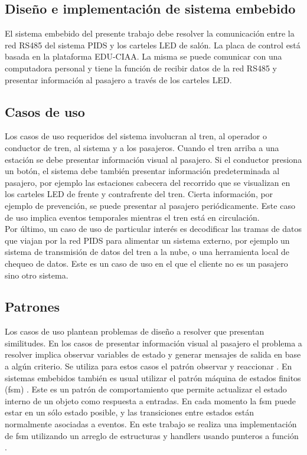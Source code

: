 \documentclass[conference]{IEEEtran}
\begin{document}
\subsection{Diseño e implementación de sistema embebido}

El sistema embebido del presente trabajo debe resolver la comunicación entre la red RS485 del sistema PIDS y los carteles LED de salón. La placa de control está basada en la plataforma EDU-CIAA. La misma se puede comunicar con una computadora personal y tiene la función de recibir datos de la red RS485 y presentar  información al pasajero a través de los carteles LED.\\

\subsection{Casos de uso}
Los casos de uso requeridos del sistema involucran al tren, al operador o conductor de tren, al sistema y a los pasajeros. Cuando el tren arriba a una estación se debe presentar información visual al pasajero. Si el conductor presiona un botón, el sistema debe también presentar información predeterminada al pasajero, por ejemplo las estaciones cabecera del recorrido que se visualizan en los carteles LED de frente y contrafrente del tren. Cierta información, por ejemplo de prevención, se puede presentar al pasajero periódicamente. Este caso de uso implica eventos temporales mientras el tren está en circulación.\\

 Por último, un caso de uso de particular interés es decodificar las tramas de datos que viajan por la red PIDS para alimentar un sistema externo, por ejemplo un sistema de transmisión de datos del tren a la nube, o una herramienta local de chequeo de datos.  Este es un caso de uso en el que el cliente no es un pasajero sino otro sistema. \\

\subsection{Patrones}
Los casos de uso plantean problemas de diseño a resolver que presentan similitudes. En los casos de presentar información visual al pasajero el problema a resolver implica observar variables de estado y generar mensajes de salida en base a algún criterio. Se utiliza para estos casos el patrón observar y reaccionar \cite{b8}. En sistemas embebidos también es usual utilizar el patrón máquina de estados finitos (fsm) \cite{b9}. Este es un patrón de comportamiento que permite actualizar el estado interno de un objeto como respuesta a entradas. En cada momento la fsm puede estar en un sólo estado posible, y las transiciones entre estados están normalmente asociadas a eventos. En este trabajo se realiza una implementación de fsm utilizando un arreglo de estructuras y handlers usando punteros a función \cite{b10}. \\
\end{document}
